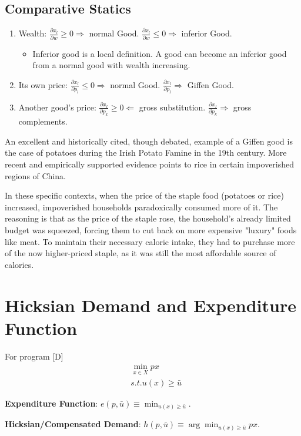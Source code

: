 \subsection{Comparative Statics}

\begin{enumerate}
    \item  Wealth: $\frac{\partial x_l}{\partial w} \geq 0 \Longrightarrow$ normal Good. $\frac{\partial x_l}{\partial w} \leq 0 \Longrightarrow$ inferior Good. \begin{itemize}
              \item Inferior good is a local definition. A good can become an inferior good from a normal good with wealth increasing.
          \end{itemize}
    \item Its own price: $\frac{\partial x_l}{\partial p_l} \leq 0 \Longrightarrow$ normal Good. $\frac{\partial x_l}{\partial p_l} \Longrightarrow $ Giffen Good.
    \item Another good's price: $\frac{\partial x_l}{\partial p_k} \geq 0 \Longleftarrow $ gross substitution. $\frac{\partial x_l}{\partial p_k} \Longrightarrow $ gross complements.
\end{enumerate}

\begin{example}
    An excellent and historically cited, though debated, example of a Giffen good is the case of potatoes during the Irish Potato Famine in the 19th century. More recent and empirically supported evidence points to rice in certain impoverished regions of China.

    In these specific contexts, when the price of the staple food (potatoes or rice) increased, impoverished households paradoxically consumed more of it. The reasoning is that as the price of the staple rose, the household's already limited budget was squeezed, forcing them to cut back on more expensive "luxury" foods like meat. To maintain their necessary caloric intake, they had to purchase more of the now higher-priced staple, as it was still the most affordable source of calories.
\end{example}

\section{Hicksian Demand and Expenditure Function}

\begin{definition}
    For program [D]\begin{align*}
         & \min_{x \in X} px      \\
         & s.t. u(x) \geq \bar{u}
    \end{align*}

    \textbf{Expenditure Function}: $e(p,\bar{u}) \equiv \min_{u(x)\geq \bar{u}}$.

    \textbf{Hicksian/Compensated Demand}: $h(p,\bar{u}) \equiv \arg \min_{u(x) \geq \bar{u}} px$.
\end{definition}

